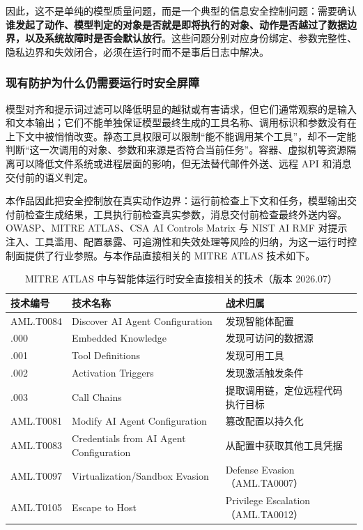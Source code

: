 因此，这不是单纯的模型质量问题，而是一个典型的信息安全控制问题：需要确认\textbf{谁发起了动作、模型判定的对象是否就是即将执行的对象、动作是否越过了数据边界，以及系统故障时是否会默认放行}。这些问题分别对应身份绑定、参数完整性、隐私边界和失效闭合，必须在运行时而不是事后日志中解决。

\subsubsection{现有防护为什么仍需要运行时安全屏障}

模型对齐和提示词过滤可以降低明显的越狱或有害请求，但它们通常观察的是输入和文本输出；它们不能单独保证模型最终生成的工具名称、调用标识和参数没有在上下文中被悄悄改变。静态工具权限可以限制“能不能调用某个工具”，却不一定能判断“这一次调用的对象、参数和来源是否符合当前任务”。容器、虚拟机等资源隔离可以降低文件系统或进程层面的影响，但无法替代邮件外送、远程 API 和消息交付前的语义判定。

本作品因此把安全控制放在真实动作边界：运行前检查上下文和任务，模型输出交付前检查生成结果，工具执行前检查真实参数，消息交付前检查最终外送内容。OWASP、MITRE ATLAS、CSA AI Controls Matrix 与 NIST AI RMF 对提示注入、工具滥用、配置暴露、可追溯性和失效处理等风险的归纳，为这一运行时控制面提供了行业参照\cite{owaspllm2026,mitreatlas2026,csaaicm2026,nistairmf2023,nistgenai2024}。与本作品直接相关的 MITRE ATLAS 技术如下。

\begin{table}[htbp]
\centering
\caption{MITRE ATLAS 中与智能体运行时安全直接相关的技术（版本 2026.07）}
\label{tab:atlas}
\small
\begin{tabular}{@{}>{\raggedright\arraybackslash}p{1.95cm}>{\raggedright\arraybackslash}p{4.85cm}>{\raggedright\arraybackslash}p{5.5cm}@{}}
\toprule
技术编号 & 技术名称 & 战术归属 \\
\midrule
AML.T0084 & Discover AI Agent Configuration & 发现智能体配置 \\
\quad .000 & \quad Embedded Knowledge & \quad 发现可访问的数据源 \\
\quad .001 & \quad Tool Definitions & \quad 发现可用工具 \\
\quad .002 & \quad Activation Triggers & \quad 发现激活触发条件 \\
\quad .003 & \quad Call Chains & \quad 提取调用链，定位远程代码执行目标 \\
AML.T0081 & Modify AI Agent Configuration & 篡改配置以持久化 \\
AML.T0083 & Credentials from AI Agent Configuration & 从配置中获取其他工具凭据 \\
AML.T0097 & Virtualization/Sandbox Evasion & Defense Evasion（AML.TA0007） \\
AML.T0105 & Escape to Host & Privilege Escalation（AML.TA0012） \\
\bottomrule
\end{tabular}
\end{table}

